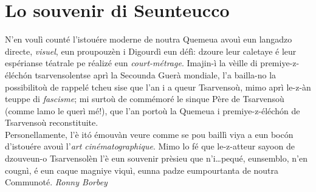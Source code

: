 \section*{Lo souvenir di Seunteucco}
\og N'en voulì counté l'istouére moderne de noutra Quemeua avouì eun langadzo directe, \textit{visuel}, eun proupouzèn i Digourdì eun défì: dzoure leur caletaye é leur espérianse téatrale pe réalizé eun \textit{court-métrage}. Imajin-ì la vèille di premiye-z-éléch\'on tsarvensolentse aprì la Secounda Guerà mondiale, l'a bailla-no la possibilitoù de rappelé tcheu sise que l'an i a queur Tsarvensoù, mimo aprì le-z-àn teuppe di \textit{fascisme}; mi surtoù de commémoré le sinque Père de Tsarvensoù (comme lamo le querì mé!), que l'an portoù la Quemeua i premiye-z-éléch\'on de Tsarvensoù reconstituite.
\\Personellamente, l'è it\'o émouvàn veure comme se pou baillì viya a eun boc\'on d'istouére avouì l'\textit{art cinématographique}. Mimo lo fé que le-z-atteur sayoon de dzouveun-o Tsarvensolèn l'è eun souvenir prèsieu que n'i\ldots pequé, eunsemblo, n'en cougnì, é eun caque magniye viquì, eunna padze eumpourtanta de noutra Communoté.
\fg{}
\newline
\newline
\hspace*{\fill} \textit{Ronny Borbey}

%
